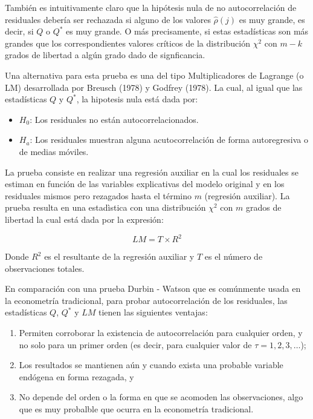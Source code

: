 \documentclass[
  a4paper,
]{article}
\begin{document}
También es intuitivamente claro que la hipótesis nula de no
autocorrelación de residuales debería ser rechazada si alguno de los
valores \(\hat{\rho} (j)\) es muy grande, es decir, si \(Q\) o \(Q^*\)
es muy grande. O más precisamente, si estas estadísticas son más grandes
que los correspondientes valores críticos de la distribución \(\chi^2\)
con \(m-k\) grados de libertad a algún grado dado de signficancia.

Una alternativa para esta prueba es una del tipo Multiplicadores de
Lagrange (o LM) desarrollada por Breusch (1978) y Godfrey (1978). La
cual, al igual que las estadísticas \(Q\) y \(Q^*\), la hipotesis nula
está dada por:

\begin{itemize}
\item
  \(H_0\): Los residuales no están autocorrelacionados.
\item
  \(H_a\): Los residuales muestran alguna acutocorrelación de forma
  autoregresiva o de medias móviles.
\end{itemize}

La prueba consiste en realizar una regresión auxiliar en la cual los
residuales se estiman en función de las variables explicativas del
modelo original y en los residuales mismos pero rezagados hasta el
término \(m\) (regresión auxiliar). La prueba resulta en una estadìstica
con una distribución \(\chi^2\) con \(m\) grados de libertad la cual
está dada por la expresión:

\[
LM = T \times R^2
\]

Donde \(R^2\) es el resultante de la regresión auxiliar y \(T\) es el
número de observaciones totales.

En comparación con una prueba Durbin - Watson que es comúnmente usada en
la econometría tradicional, para probar autocorrelación de los
residuales, las estadísticas \(Q\), \(Q^*\) y \(LM\) tienen las
siguientes ventajas:

\begin{enumerate}
\def\labelenumi{\arabic{enumi}.}
\item
  Permiten corroborar la existencia de autocorrelación para cualquier
  orden, y no solo para un primer orden (es decir, para cualquier valor
  de \(\tau = 1, 2, 3, \ldots\));
\item
  Los resultados se mantienen aún y cuando exista una probable variable
  endógena en forma rezagada, y
\item
  No depende del orden o la forma en que se acomoden las observaciones,
  algo que es muy probalble que ocurra en la econometría tradicional.
\end{enumerate}
\end{document}
